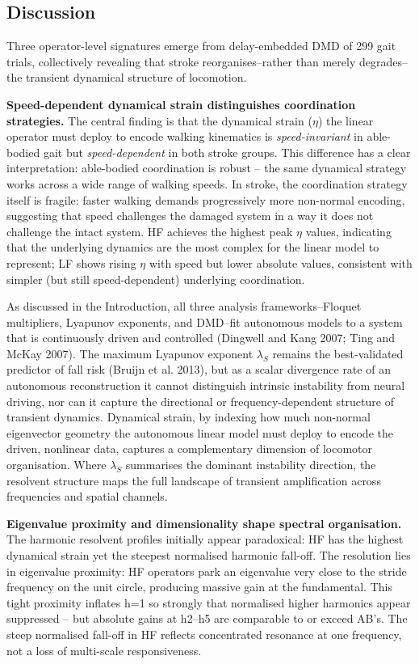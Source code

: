 \documentclass[
  letterpaper,
  DIV=11,
  numbers=noendperiod]{scrartcl}
\begin{document}
\subsection{Discussion}\label{discussion}

Three operator-level signatures emerge from delay-embedded DMD of 299
gait trials, collectively revealing that stroke reorganises--rather than
merely degrades--the transient dynamical structure of locomotion.

\textbf{Speed-dependent dynamical strain distinguishes coordination
strategies.} The central finding is that the dynamical strain (\(\eta\))
the linear operator must deploy to encode walking kinematics is
\emph{speed-invariant} in able-bodied gait but \emph{speed-dependent} in
both stroke groups. This difference has a clear interpretation:
able-bodied coordination is robust -- the same dynamical strategy works
across a wide range of walking speeds. In stroke, the coordination
strategy itself is fragile: faster walking demands progressively more
non-normal encoding, suggesting that speed challenges the damaged system
in a way it does not challenge the intact system. HF achieves the
highest peak \(\eta\) values, indicating that the underlying dynamics
are the most complex for the linear model to represent; LF shows rising
\(\eta\) with speed but lower absolute values, consistent with simpler
(but still speed-dependent) underlying coordination.

As discussed in the Introduction, all three analysis frameworks--Floquet
multipliers, Lyapunov exponents, and DMD--fit autonomous models to a
system that is continuously driven and controlled (Dingwell and Kang
2007; Ting and McKay 2007). The maximum Lyapunov exponent \(\lambda_S\)
remains the best-validated predictor of fall risk (Bruijn et al. 2013),
but as a scalar divergence rate of an autonomous reconstruction it
cannot distinguish intrinsic instability from neural driving, nor can it
capture the directional or frequency-dependent structure of transient
dynamics. Dynamical strain, by indexing how much non-normal eigenvector
geometry the autonomous linear model must deploy to encode the driven,
nonlinear data, captures a complementary dimension of locomotor
organisation. Where \(\lambda_S\) summarises the dominant instability
direction, the resolvent structure maps the full landscape of transient
amplification across frequencies and spatial channels.

\textbf{Eigenvalue proximity and dimensionality shape spectral
organisation.} The harmonic resolvent profiles initially appear
paradoxical: HF has the highest dynamical strain yet the steepest
normalised harmonic fall-off. The resolution lies in eigenvalue
proximity: HF operators park an eigenvalue very close to the stride
frequency on the unit circle, producing massive gain at the fundamental.
This tight proximity inflates h=1 so strongly that normalised higher
harmonics appear suppressed -- but absolute gains at h2--h5 are
comparable to or exceed AB's. The steep normalised fall-off in HF
reflects concentrated resonance at one frequency, not a loss of
multi-scale responsiveness.
\end{document}
